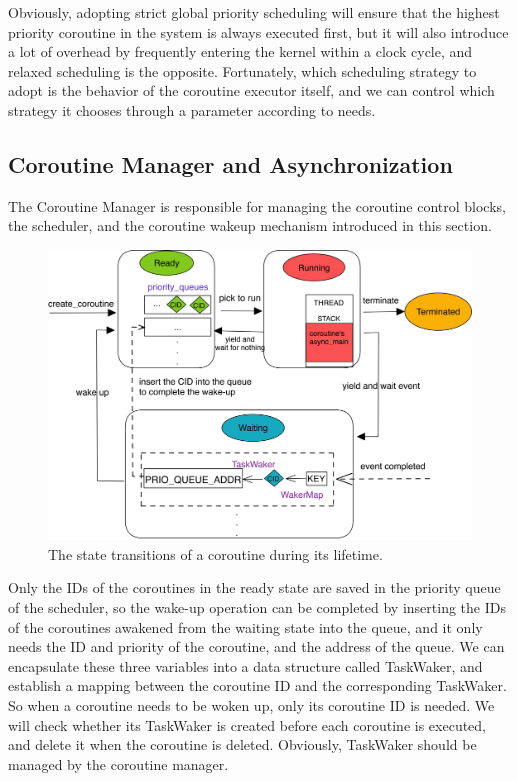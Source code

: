\documentclass[10pt]{article}
\begin{document}
Obviously, adopting strict global priority scheduling will ensure that the highest priority coroutine in the system is always executed first, but it will also introduce a lot of overhead by frequently entering the kernel within a clock cycle, and relaxed scheduling is the opposite. Fortunately, which scheduling strategy to adopt is the behavior of the coroutine executor itself, and we can control which strategy it chooses through a parameter according to needs.


\subsection{Coroutine Manager and Asynchronization }

The Coroutine Manager is responsible for managing the coroutine control blocks, the scheduler, and the coroutine wakeup mechanism introduced in this section.

\begin{figure}[ht]
\begin{center}
\centerline{\includegraphics[width=\columnwidth]{SDSS2021-LaTEX/states.png}}
\caption{The state transitions of a coroutine during its lifetime.}
\label{states}
\end{center}
\end{figure}

 Only the IDs of the coroutines in the ready state are saved in the priority queue of the scheduler, so the wake-up operation can be completed by inserting the IDs of the coroutines awakened from the waiting state into the queue, and it only needs the ID and priority of the coroutine, and the address of the queue. We can encapsulate these three variables into a data structure called TaskWaker, and establish a mapping between the coroutine ID and the corresponding TaskWaker. So when a coroutine needs to be woken up, only its coroutine ID is needed. We will check whether its TaskWaker is created before each coroutine is executed, and delete it when the coroutine is deleted. Obviously, TaskWaker should be managed by the coroutine manager.
\end{document}
